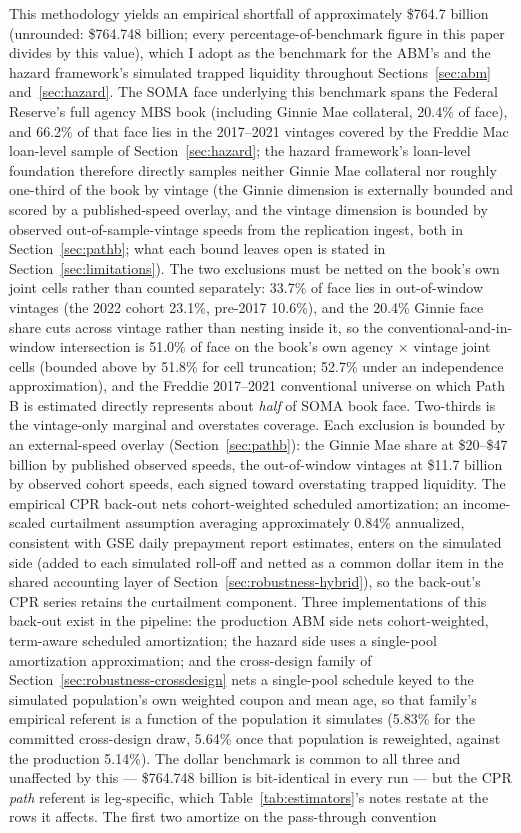 \documentclass[12pt]{article}
\begin{document}
This methodology yields an empirical shortfall of approximately \$764.7 billion (unrounded: \$764.748 billion; every percentage-of-benchmark figure in this paper divides by this value), which I adopt as the benchmark for the ABM's and the hazard framework's simulated trapped liquidity throughout Sections~\ref{sec:abm} and~\ref{sec:hazard}. The SOMA face underlying this benchmark spans the Federal Reserve's full agency MBS book (including Ginnie Mae collateral, 20.4\% of face), and 66.2\% of that face lies in the 2017--2021 vintages covered by the Freddie Mac loan-level sample of Section~\ref{sec:hazard}; the hazard framework's loan-level foundation therefore directly samples neither Ginnie Mae collateral nor roughly one-third of the book by vintage (the Ginnie dimension is externally bounded and scored by a published-speed overlay, and the vintage dimension is bounded by observed out-of-sample-vintage speeds from the replication ingest, both in Section~\ref{sec:pathb}; what each bound leaves open is stated in Section~\ref{sec:limitations}). The two exclusions must be netted on the book's own joint cells rather than counted separately: 33.7\% of face lies in out-of-window vintages (the 2022 cohort 23.1\%, pre-2017 10.6\%), and the 20.4\% Ginnie face share cuts across vintage rather than nesting inside it, so the conventional-and-in-window intersection is 51.0\% of face on the book's own agency $\times$ vintage joint cells (bounded above by 51.8\% for cell truncation; 52.7\% under an independence approximation), and the Freddie 2017--2021 conventional universe on which Path B is estimated directly represents about \emph{half} of SOMA book face. Two-thirds is the vintage-only marginal and overstates coverage. Each exclusion is bounded by an external-speed overlay (Section~\ref{sec:pathb}): the Ginnie Mae share at \$20--\$47 billion by published observed speeds, the out-of-window vintages at \$11.7 billion by observed cohort speeds, each signed toward overstating trapped liquidity. The empirical CPR back-out nets cohort-weighted scheduled amortization; an income-scaled curtailment assumption averaging approximately 0.84\% annualized, consistent with GSE daily prepayment report estimates, enters on the simulated side (added to each simulated roll-off and netted as a common dollar item in the shared accounting layer of Section~\ref{sec:robustness-hybrid}), so the back-out's CPR series retains the curtailment component. Three implementations of this back-out exist in the pipeline: the production ABM side nets cohort-weighted, term-aware scheduled amortization; the hazard side uses a single-pool amortization approximation; and the cross-design family of Section~\ref{sec:robustness-crossdesign} nets a single-pool schedule keyed to the simulated population's own weighted coupon and mean age, so that family's empirical referent is a function of the population it simulates (5.83\% for the committed cross-design draw, 5.64\% once that population is reweighted, against the production 5.14\%). The dollar benchmark is common to all three and unaffected by this --- \$764.748 billion is bit-identical in every run --- but the CPR \emph{path} referent is leg-specific, which Table~\ref{tab:estimators}'s notes restate at the rows it affects. The first two amortize on the pass-through convention 
\end{document}
